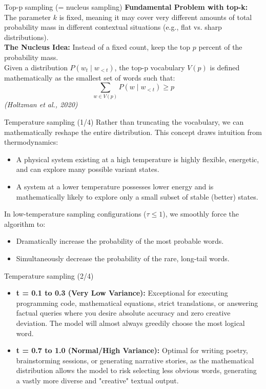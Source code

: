 \documentclass[aspectratio=169]{beamer}
\begin{document}
\begin{frame}{Top-p sampling (= nucleus sampling)}\justifying
    \textbf{Fundamental Problem with top-k:} The parameter $k$ is fixed, meaning it may cover very different amounts of total probability mass in different contextual situations (e.g., flat vs. sharp distributions). \\
    \vspace{0.3cm}
    \textbf{The Nucleus Idea:} Instead of a fixed count, keep the top $p$ percent of the probability mass. \\
    \vspace{0.3cm}
    Given a distribution $P(w_t \mid w_{<t})$, the top-p vocabulary $V(p)$ is defined mathematically as the smallest set of words such that:
    \[ \sum_{w \in V(p)} P(w \mid w_{<t}) \ge p \]
    \vspace{0.3cm}
    \raggedleft \textit{(Holtzman et al., 2020)}
\end{frame}

\begin{frame}{Temperature sampling (1/4)}\justifying
    Rather than truncating the vocabulary, we can mathematically reshape the entire distribution. This concept draws intuition from thermodynamics:
    \begin{itemize}
        \item A physical system existing at a high temperature is highly flexible, energetic, and can explore many possible variant states.
        \item A system at a lower temperature possesses lower energy and is mathematically likely to explore only a small subset of stable (better) states.
    \end{itemize}
    In low-temperature sampling configurations ($\tau \le 1$), we smoothly force the algorithm to:
    \begin{itemize}
        \item Dramatically increase the probability of the most probable words.
        \item Simultaneously decrease the probability of the rare, long-tail words.
    \end{itemize}
\end{frame}

\begin{frame}{Temperature sampling (2/4)}\justifying
    \begin{itemize}
        \item \textbf{t = 0.1 to 0.3 (Very Low Variance):} Exceptional for executing programming code, mathematical equations, strict translations, or answering factual queries where you desire absolute accuracy and zero creative deviation. The model will almost always greedily choose the most logical word.
        \item \textbf{t = 0.7 to 1.0 (Normal/High Variance):} Optimal for writing poetry, brainstorming sessions, or generating narrative stories, as the mathematical distribution allows the model to risk selecting less obvious words, generating a vastly more diverse and "creative" textual output.
    \end{itemize}
\end{frame}
\end{document}
